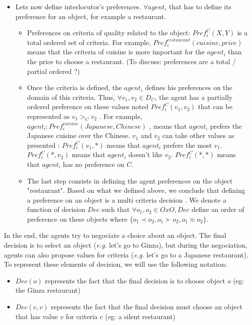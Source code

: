 \documentclass{llncs}
\begin{document}
\begin{itemize}
 \item Lets now define interlocutor's preferences. $\forall agent_{i}$ that has to define its preference for an object, for example a restaurant.
 \begin{itemize}
 \item Preferences on criteria of quality related to the object: $Pref_{i}^C (X,Y) $ is a total ordered set of criteria. For example, $ Pref_{i}^{restaurant} (cuisine,price)$ means that the criteria of cuisine is more important for the $agent_{i}$  than the price to choose a restaurant. (To discuss: preferences are a total / partial ordered ?)
 \item Once the criteria is defined, the $agent_{i}$ defines his preferences on the domain of this criteria. Thus, $\forall v_{1} , v_{2} \in D_{C}$, the agent has a  partially ordered preference on these values noted $Pref_{i}^C (v_{1}, v_{2})$  that can be represented as $v_{1}>_{C} v_{2}$ . For example, $agent_{i}:  Pref_{i}^{cuisine} (Japanese , Chinese)$ , means that  $agent_{i}$ prefers the Japanese cuisine over the Chinese. $v_{1} $ and $ v_{2}$ can take other values as presented : 
 \subitem $Pref_{i}^C (v_{1}, *)$ means that $agent_{i}$ prefers the most $v_{1}$. 
 \subitem $Pref_{i}^C (*,v_{2})$ means that $agent_{i}$ doesn't like  $v_{2}$. 
 \subitem $Pref_{i}^C (*,*)$ means that $agent_{i}$ has no preference on $C$. 
 \item The last step consists in defining the agent preferences on the object "restaurant". Based on what we defined above, we conclude that defining a preference on an object is a multi criteria decision \cite{figueira2005multiple}. We denote a function of decision  $Dec$ such that $\forall o_{1}, o_{2} \in O x O, Dec$ define an order of preference on these objects where  $\{o_{1}\prec o_{2}, o_{1} \succ o_{2}, o_{1} \approx o_{2}\}$.
 \end{itemize} 
 \end{itemize}
 
 In the end, the agents try to negociate a choice about an object. The final decision is to select an object (\emph{e.g.} let's go to Ginza), but during the negociation, agents can also propose values for criteria (\emph{e.g.} let's go to a Japanese restaurant). To represent these elements of decision, we will use the following notation:
 \begin{itemize}
   \item $Dec(o)$ represents the fact that the final decision is to choose object $o$ (eg: the Ginza restaurant)
   \item $Dec(c,v)$ represents the fact that the final decision must choose an object that has value $v$ for criteria $c$ (eg: a silent restaurant)
 \end{itemize}
\end{document}
